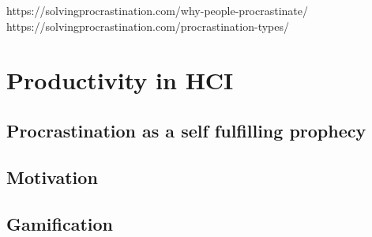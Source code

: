 https://solvingprocrastination.com/why-people-procrastinate/
https://solvingprocrastination.com/procrastination-types/


\section{Productivity in HCI}












\subsection{Procrastination as a self fulfilling prophecy}














\subsection{Motivation}


\subsection{Gamification}




